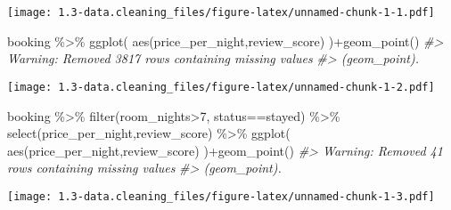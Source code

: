 \documentclass[
]{book}
\newenvironment{Shaded}{\begin{snugshade}}{\end{snugshade}}
\newcommand{\CommentTok}[1]{\textcolor[rgb]{0.56,0.35,0.01}{\textit{#1}}}
\newcommand{\DecValTok}[1]{\textcolor[rgb]{0.00,0.00,0.81}{#1}}
\newcommand{\FunctionTok}[1]{\textcolor[rgb]{0.00,0.00,0.00}{#1}}
\newcommand{\NormalTok}[1]{#1}
\newcommand{\SpecialCharTok}[1]{\textcolor[rgb]{0.00,0.00,0.00}{#1}}
\newcommand{\StringTok}[1]{\textcolor[rgb]{0.31,0.60,0.02}{#1}}
\begin{document}
\texttt{[image: 1.3-data.cleaning\_files/figure-latex/unnamed-chunk-1-1.pdf]}

\begin{Shaded}
\begin{Highlighting}[]
 
\NormalTok{booking }\SpecialCharTok{\%\textgreater{}\%} 
  \FunctionTok{ggplot}\NormalTok{(}
    \FunctionTok{aes}\NormalTok{(price\_per\_night,review\_score)}
\NormalTok{  )}\SpecialCharTok{+}\FunctionTok{geom\_point}\NormalTok{()}
\CommentTok{\#\textgreater{} Warning: Removed 3817 rows containing missing values}
\CommentTok{\#\textgreater{} (geom\_point).}
\end{Highlighting}
\end{Shaded}

\texttt{[image: 1.3-data.cleaning\_files/figure-latex/unnamed-chunk-1-2.pdf]}

\begin{Shaded}
\begin{Highlighting}[]
 
\NormalTok{booking }\SpecialCharTok{\%\textgreater{}\%} 
  \FunctionTok{filter}\NormalTok{(room\_nights}\SpecialCharTok{\textgreater{}}\DecValTok{7}\NormalTok{, status}\SpecialCharTok{==}\StringTok{\textquotesingle{}stayed\textquotesingle{}}\NormalTok{) }\SpecialCharTok{\%\textgreater{}\%} 
  \FunctionTok{select}\NormalTok{(price\_per\_night,review\_score) }\SpecialCharTok{\%\textgreater{}\%} 
  \FunctionTok{ggplot}\NormalTok{(}
    \FunctionTok{aes}\NormalTok{(price\_per\_night,review\_score)}
\NormalTok{  )}\SpecialCharTok{+}\FunctionTok{geom\_point}\NormalTok{()}
\CommentTok{\#\textgreater{} Warning: Removed 41 rows containing missing values}
\CommentTok{\#\textgreater{} (geom\_point).}
\end{Highlighting}
\end{Shaded}

\texttt{[image: 1.3-data.cleaning\_files/figure-latex/unnamed-chunk-1-3.pdf]}
\end{document}
